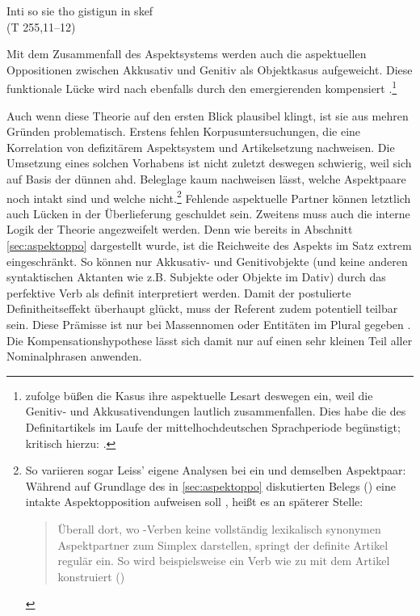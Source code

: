 \begin{exe}
	\ex \label{ex:bilan} Inti so sie tho gistigun in skef   \\   (T 255,11--12)
\end{exe}
\noindent
Mit dem Zusammenfall des Aspektsystems  werden auch die aspektuellen Oppositionen  zwischen Akkusativ und Genitiv als Objektkasus  aufgeweicht. Diese funktionale Lücke wird nach \textcite[187--193]{Leiss2000} ebenfalls durch den emergierenden  kompensiert \parencite[vgl. auch][46--47]{Abraham1997}.\footnote{\textcite[88--89]{Philippi1997} zufolge büßen die Kasus  ihre aspektuelle Lesart  deswegen ein, weil die Genitiv- und Akkusativendungen  lautlich zusammenfallen. Dies habe die  des Definitartikels  im Laufe der mittelhochdeutschen Sprachperiode begünstigt; kritisch hierzu: \textcite[234--235]{Lyons1999}.}

Auch wenn diese Theorie auf den ersten Blick plausibel klingt, ist sie aus mehren Gründen problematisch. Erstens fehlen  Korpusuntersuchungen, die eine Korrelation von defizitärem Aspektsystem  und Artikelsetzung nachweisen. Die Umsetzung eines solchen Vorhabens ist nicht zuletzt deswegen schwierig, weil sich auf Basis der dünnen ahd. Beleglage kaum nachweisen lässt, welche Aspektpaare  noch intakt sind und welche nicht.\footnote{So variieren sogar Leiss' eigene Analysen bei ein und demselben  Aspektpaar: Während  auf Grundlage des in \ref{sec:aspektoppo} diskutierten Belegs () eine intakte Aspektopposition  aufweisen soll \parencite[171]{Leiss2000}, heißt es an späterer Stelle: \blockcquote[182]{Leiss2000}{Überall dort, wo -Verben keine vollständig lexikalisch synonymen Aspektpartner  zum Simplex darstellen, springt der definite Artikel regulär ein. So wird beispielsweise ein Verb wie   zu   mit dem Artikel konstruiert ()}.} Fehlende aspektuelle  Partner können letztlich auch Lücken in der Überlieferung geschuldet sein. Zweitens muss auch die interne Logik der Theorie angezweifelt werden. Denn wie bereits in Abschnitt \ref{sec:aspektoppo} dargestellt wurde, ist die Reichweite des Aspekts  im Satz extrem eingeschränkt. So können nur Akkusativ- und Genitivobjekte  (und keine anderen syntaktischen Aktanten wie z.B. Subjekte  oder Objekte  im Dativ) durch das perfektive  Verb als definit interpretiert werden. Damit der postulierte Definitheitseffekt  überhaupt glückt, muss der Referent zudem potentiell teilbar sein. Diese Prämisse ist nur bei Massennomen  oder Entitäten im Plural gegeben \parencite{Heindl2016}. Die Kompensationshypothese lässt sich damit nur auf einen sehr kleinen Teil aller Nominalphrasen  anwenden. 

